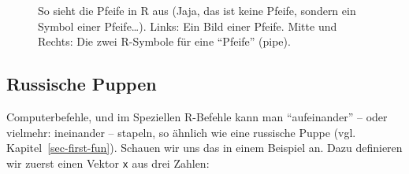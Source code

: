 \documentclass[
  a4paper,
  DIV=11]{scrreprt}
\theoremstyle{definition}
\theoremstyle{definition}
\theoremstyle{definition}
\theoremstyle{remark}
\begin{document}
\begin{figure}


\caption{\label{fig-pfeifen}So sieht die Pfeife in R aus (Jaja, das ist
keine Pfeife, sondern ein Symbol einer Pfeife\ldots). Links: Ein Bild
einer Pfeife. Mitte und Rechts: Die zwei R-Symbole für eine ``Pfeife''
(pipe).}

\end{figure}%

\subsection{Russische Puppen}\label{russische-puppen}

Computerbefehle, und im Speziellen R-Befehle kann man ``aufeinander'' --
oder vielmehr: ineinander -- stapeln, so ähnlich wie eine russische
Puppe (vgl. Kapitel~\ref{sec-first-fun}). Schauen wir uns das in einem
Beispiel an. Dazu definieren wir zuerst einen Vektor \texttt{x} aus drei
Zahlen:
\end{document}
